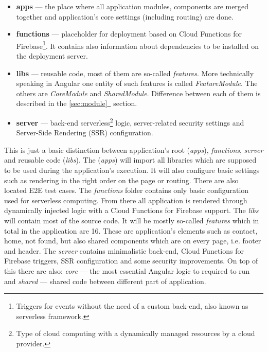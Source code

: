 \documentclass{article} %
\newcommand{\fullref}[1]{\hyperref[#1]{\ref*{#1}\ \nameref*{#1}}}
\begin{document}
\begin{itemize}
    \item \textbf{apps} --- the place where all application modules, components are merged together and application's core settings (including routing) are done.
    \item \textbf{functions} ---  placeholder for deployment based on Cloud Functions for Firebase\footnote{Triggers for events without the need of a custom back-end, also known as serverless framework.}. It contains also information about dependencies to be installed on the deployment server.
    \item \textbf{libs} --- reusable code, most of them are so-called \textit{features}. More technically speaking in Angular one entity of such features is called \textit{FeatureModule}. The others are \textit{CoreModule} and \textit{SharedModule}. Difference between each of them is described in the \fullref{sec:module} section.
    \item \textbf{server} --- back-end serverless\footnote{Type of cloud computing with a dynamically managed resources by a cloud provider.} logic, server-related security settings and Server-Side Rendering (SSR) configuration.
\end{itemize}
This is just a basic distinction between application's root (\textit{apps}), \textit{functions}, \textit{server} and reusable code (\textit{libs}). The (\textit{apps}) will import all libraries which are supposed to be used during the application's execution. It will also configure basic settings such as rendering in the right order on the page or routing. There are also located E2E test cases. The \textit{functions} folder contains only basic configuration used for serverless computing. From there all application is rendered through dynamically injected logic with a Cloud Functions for Firebase support. The \textit{libs} will contain most of the source code. It will be mostly so-called \textit{features} which in total in the application are 16. These are application's elements such as contact, home, not found, but also shared components which are on every page, i.e. footer and header. The \textit{server} contains minimalistic back-end, Cloud Functions for Firebase triggers, SSR configuration and some security improvements. On top of this there are also: \textit{core} --- the most essential Angular logic to required to run and \textit{shared} --- shared code between different part of application.
\end{document}
